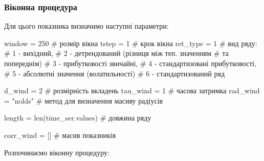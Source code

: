 \documentclass[
  letterpaper,
]{report}
\newenvironment{Shaded}{\begin{snugshade}}{\end{snugshade}}
\newcommand{\BuiltInTok}[1]{\textcolor[rgb]{0.00,0.23,0.31}{#1}}
\newcommand{\CommentTok}[1]{\textcolor[rgb]{0.37,0.37,0.37}{#1}}
\newcommand{\DecValTok}[1]{\textcolor[rgb]{0.68,0.00,0.00}{#1}}
\newcommand{\NormalTok}[1]{\textcolor[rgb]{0.00,0.23,0.31}{#1}}
\newcommand{\OperatorTok}[1]{\textcolor[rgb]{0.37,0.37,0.37}{#1}}
\newcommand{\StringTok}[1]{\textcolor[rgb]{0.13,0.47,0.30}{#1}}
\begin{document}
\hypertarget{ux432ux456ux43aux43eux43dux43dux430-ux43fux440ux43eux446ux435ux434ux443ux440ux430-9}{%
\subsubsection{Віконна
процедура}\label{ux432ux456ux43aux43eux43dux43dux430-ux43fux440ux43eux446ux435ux434ux443ux440ux430-9}}

Для цього показника визначимо наступні параметри:

\begin{Shaded}
\begin{Highlighting}[]
\NormalTok{window }\OperatorTok{=} \DecValTok{250}    \CommentTok{\# розмір вікна}
\NormalTok{tstep }\OperatorTok{=} \DecValTok{1}       \CommentTok{\# крок вікна}
\NormalTok{ret\_type }\OperatorTok{=} \DecValTok{1}    \CommentTok{\# вид ряду: }
                \CommentTok{\# 1 {-} вихідний, }
                \CommentTok{\# 2 {-} детрендований (різниця між теп. значенням }
                                                \CommentTok{\# та попереднім)}
                \CommentTok{\# 3 {-} прибутковості звичайні, }
                \CommentTok{\# 4 {-} стандартизовані прибутковості, }
                \CommentTok{\# 5 {-} абсолютні значення (волатильності)}
                \CommentTok{\# 6 {-} стандартизований ряд}

\NormalTok{d\_wind }\OperatorTok{=} \DecValTok{2}          \CommentTok{\# розмірність вкладень}
\NormalTok{tau\_wind }\OperatorTok{=} \DecValTok{1}        \CommentTok{\# часова затримка}
\NormalTok{rad\_wind }\OperatorTok{=} \StringTok{"nolds"}  \CommentTok{\# метод для визначення масиву радіусів}

\NormalTok{length }\OperatorTok{=} \BuiltInTok{len}\NormalTok{(time\_ser.values)      }\CommentTok{\# довжина ряду}

\NormalTok{corr\_wind }\OperatorTok{=}\NormalTok{ []                     }\CommentTok{\# масив показників }
\end{Highlighting}
\end{Shaded}

Розпочинаємо віконну процедуру:
\end{document}
